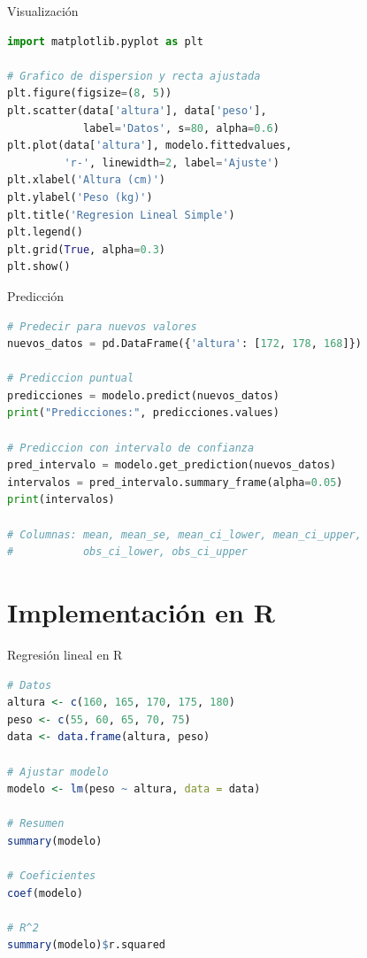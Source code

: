 \documentclass[aspectratio=169]{beamer}
\begin{document}
\begin{frame}[fragile]{Visualización}
\begin{lstlisting}[language=Python]
import matplotlib.pyplot as plt

# Grafico de dispersion y recta ajustada
plt.figure(figsize=(8, 5))
plt.scatter(data['altura'], data['peso'], 
            label='Datos', s=80, alpha=0.6)
plt.plot(data['altura'], modelo.fittedvalues, 
         'r-', linewidth=2, label='Ajuste')
plt.xlabel('Altura (cm)')
plt.ylabel('Peso (kg)')
plt.title('Regresion Lineal Simple')
plt.legend()
plt.grid(True, alpha=0.3)
plt.show()
\end{lstlisting}
\end{frame}

\begin{frame}[fragile]{Predicción}
\begin{lstlisting}[language=Python]
# Predecir para nuevos valores
nuevos_datos = pd.DataFrame({'altura': [172, 178, 168]})

# Prediccion puntual
predicciones = modelo.predict(nuevos_datos)
print("Predicciones:", predicciones.values)

# Prediccion con intervalo de confianza
pred_intervalo = modelo.get_prediction(nuevos_datos)
intervalos = pred_intervalo.summary_frame(alpha=0.05)
print(intervalos)

# Columnas: mean, mean_se, mean_ci_lower, mean_ci_upper,
#           obs_ci_lower, obs_ci_upper
\end{lstlisting}
\end{frame}

\section{Implementación en R}

\begin{frame}[fragile]{Regresión lineal en R}
\begin{lstlisting}[language=R]
# Datos
altura <- c(160, 165, 170, 175, 180)
peso <- c(55, 60, 65, 70, 75)
data <- data.frame(altura, peso)

# Ajustar modelo
modelo <- lm(peso ~ altura, data = data)

# Resumen
summary(modelo)

# Coeficientes
coef(modelo)

# R^2
summary(modelo)$r.squared
\end{lstlisting}
\end{frame}
\end{document}
